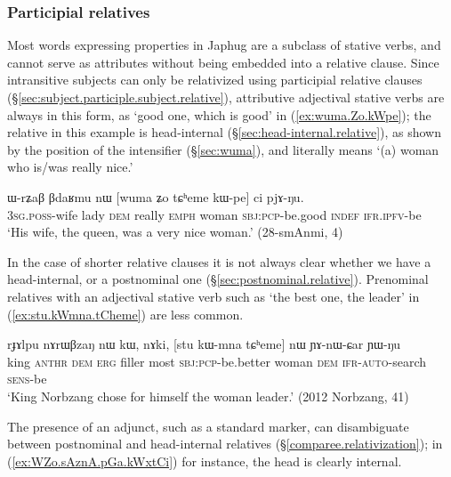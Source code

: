 \subsubsection{Participial relatives} \label{ex:attributive.participles.stative.verbs}
Most words expressing properties in Japhug are a subclass of stative verbs, and cannot serve as attributes without being embedded into a relative clause. Since intransitive subjects can only be relativized using  participial relative clauses (§\ref{sec:subject.participle.subject.relative}), attributive adjectival stative verbs are always in this form, as  `good one, which is good' in (\ref{ex:wuma.Zo.kWpe}); the relative   in this example is head-internal (§\ref{sec:head-internal.relative}), as shown by the position of the intensifier  (§\ref{sec:wuma}), and literally means `(a) woman who is/was really nice.'

\begin{exe}
   \ex  \label{ex:wuma.Zo.kWpe}
\gll  ɯ-rʑaβ βdaʁmu nɯ [wuma ʑo tɕʰeme kɯ-pe] ci pjɤ-ŋu. \\
\textsc{3sg}.\textsc{poss}-wife lady \textsc{dem} really \textsc{emph} woman \textsc{sbj}:\textsc{pcp}-be.good \textsc{indef} \textsc{ifr}.\textsc{ipfv}-be \\
\glt `His wife, the queen, was a very nice woman.' (28-smAnmi, 4)
\end{exe}  

In the case of shorter relative clauses it is not always clear whether we have a head-internal, or a postnominal one (§\ref{sec:postnominal.relative}). Prenominal relatives with an adjectival stative verb such as  `the best one, the leader' in (\ref{ex:stu.kWmna.tCheme}) are less common.


\begin{exe}
\ex \label{ex:stu.kWmna.tCheme}
\gll  rɟɤlpu nɤrɯβzaŋ nɯ kɯ, nɤki, [stu kɯ-mna tɕʰeme] nɯ ɲɤ-nɯ-ɕar ɲɯ-ŋu \\
king  \textsc{anthr} \textsc{dem} \textsc{erg} filler most \textsc{sbj}:\textsc{pcp}-be.better woman \textsc{dem} \textsc{ifr}-\textsc{auto}-search \textsc{sens}-be \\
\glt `King Norbzang chose for himself the woman leader.' (2012 Norbzang, 41)
\end{exe} 


The presence of an adjunct, such as a standard marker, can disambiguate between postnominal and head-internal relatives (§\ref{comparee.relativization}); in (\ref{ex:WZo.sAznA.pGa.kWxtCi}) for instance, the head  is clearly internal.

